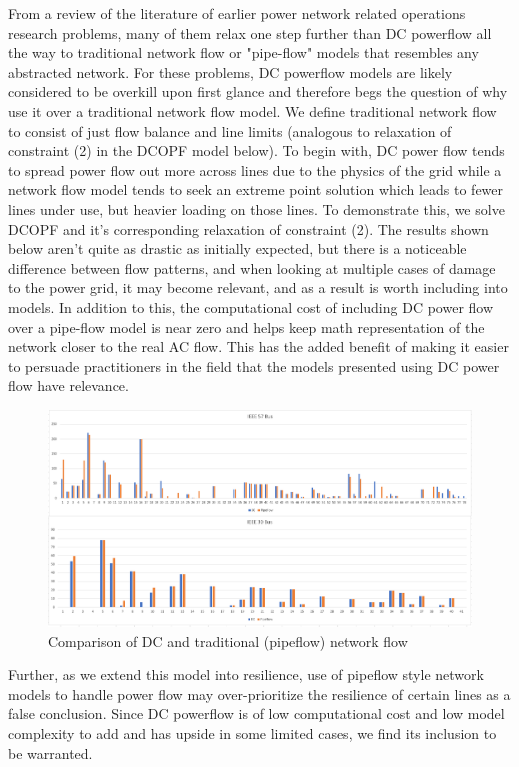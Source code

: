 \documentclass{article}
\begin{document}
	From a review of the literature of earlier power network related operations research problems, many of them relax one step further than DC powerflow all the way to traditional network flow or "pipe-flow" models that resembles any abstracted network. For these problems, DC powerflow models are likely considered to be overkill upon first glance and therefore begs the question of why use it over a traditional network flow model. We define traditional network flow to consist of just flow balance and line limits (analogous to relaxation of constraint (2) in the DCOPF model below). To begin with, DC power flow tends to spread power flow out more across lines due to the physics of the grid while a network flow model tends to seek an extreme point solution which leads to fewer lines under use, but heavier loading on those lines. To demonstrate this, we solve DCOPF and it's corresponding relaxation of constraint (2). The results shown below aren't quite as drastic as initially expected, but there is a noticeable difference between flow patterns, and when looking at multiple cases of damage to the power grid, it may become relevant, and as a result is worth including into models. In addition to this, the computational cost of including DC power flow over a pipe-flow model is near zero and helps keep math representation of the network closer to the real AC flow. This has the added benefit of making it easier to persuade practitioners in the field that the models presented using DC power flow have relevance.
	
	\begin{figure}
		\centering
		\includegraphics[width=\linewidth]{DCvsPipeflow.PNG}
		\caption{Comparison of DC and traditional (pipeflow) network flow}
	\end{figure}
	
	Further, as we extend this model into resilience, use of pipeflow style network models to handle power flow may over-prioritize the resilience of certain lines as a false conclusion. Since DC powerflow is of low computational cost and low model complexity to add and has upside in some limited cases, we find its inclusion to be warranted.
\end{document}
